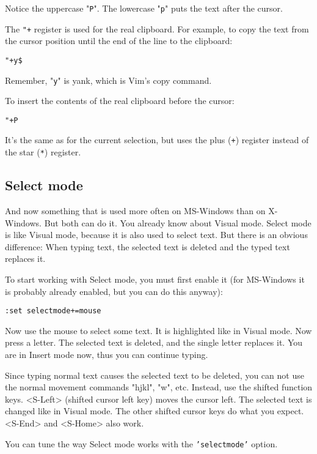 Notice the uppercase "\texttt{P}".
The lowercase "\texttt{p}" puts the text after the cursor.

The \texttt{"+} register is used for the real clipboard.
For example, to copy the text from the cursor position until the end of the line to the clipboard:

 \begin{Verbatim}[samepage=true]
 "+y$
 \end{Verbatim}

Remember, "\texttt{y}" is yank, which is Vim's copy command.

To insert the contents of the real clipboard before the cursor:

 \begin{Verbatim}[samepage=true]
 "+P
 \end{Verbatim}

It's the same as for the current selection, but uses the plus (\texttt{+}) register instead of the star (\texttt{*}) register.
\subsection{Select mode}
\label{Select mode}
And now something that is used more often on MS-Windows than on X-Windows.
But both can do it.
You already know about Visual mode.
Select mode is like Visual mode, because it is also used to select text.
But there is an obvious difference: When typing text, the selected text is deleted and the typed text replaces it.

To start working with Select mode, you must first enable it (for MS-Windows it is probably already enabled, but you can do this anyway):

 \begin{Verbatim}[samepage=true]
 :set selectmode+=mouse
 \end{Verbatim}

Now use the mouse to select some text.
It is highlighted like in Visual mode.
Now press a letter.
The selected text is deleted, and the single letter replaces it.
You are in Insert mode now, thus you can continue typing.

Since typing normal text causes the selected text to be deleted, you can not use the normal movement commands "hjkl", "w", etc.
Instead, use the shifted function keys.
<S-Left> (shifted cursor left key) moves the cursor left.
The selected text is changed like in Visual mode.
The other shifted cursor keys do what you expect.
<S-End> and <S-Home> also work.

You can tune the way Select mode works with the \texttt{'selectmode'} option.
\clearpage
